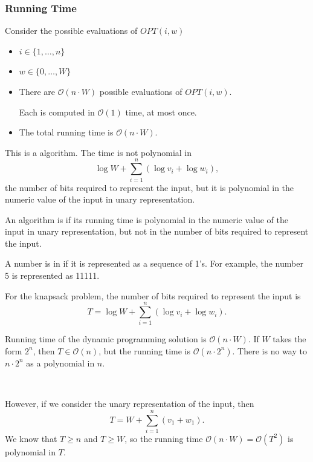 \subsubsection{Running Time}

Consider the possible evaluations of $OPT(i, w)$
\begin{itemize}
    \item $i \in \{ 1, \dots, n \}$
    \item $w \in \{ 0, \dots, W \}$
    \item There are $\mathcal{O}(n \cdot W)$ possible evaluations of $OPT(i, w)$.

    Each is computed in $\mathcal{O}(1)$ time, at most once. 

    \item The total running time is $\mathcal{O}(n \cdot W)$.
\end{itemize}

This is a  algorithm. The time is not polynomial in \[ \log W + \sum_{i=1}^n (\log v_i + \log w_i), \] the number of bits required to represent the input, but it is polynomial in the numeric value of the input in unary representation.

\begin{definition}\label{def:pseudo-polynomial-time-algorithm}
    An algorithm is  if its running time is polynomial in the numeric value of the input in unary representation, but not in the number of bits required to represent the input.
\end{definition}

\begin{definition}\label{def:unary-representation}
    A number is in  if it is represented as a sequence of 1's. For example, the number 5 is represented as 11111.
\end{definition}

\begin{remark}
    For the knapsack problem, the number of bits required to represent the input is \[
        T = \log W + \sum_{i=1}^n (\log v_i + \log w_i).
    \]

    Running time of the dynamic programming solution is $\mathcal{O}(n \cdot W)$. If $W$ takes the form $2^n$, then $T \in \mathcal{O}(n)$, but the running time is $\mathcal{O}(n \cdot 2^n)$. There is no way to $n \cdot 2^n$ as a polynomial in $n$.

    {~~~}

    However, if we consider the unary representation of the input, then \[ T = W + \sum_{i=1}^n (v_1 + w_1). \] We know that $T \ge n$ and $T \ge W$, so the running time $\mathcal{O}(n \cdot W) = \mathcal{O}(T^2)$ is polynomial in $T$.
\end{remark}


